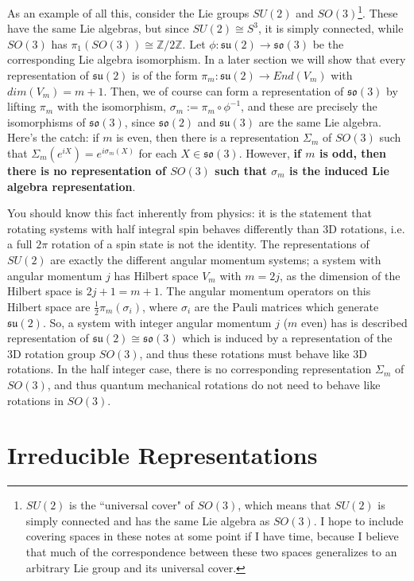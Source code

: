 \documentclass[11pt, oneside]{article}   	%
\theoremstyle{definition}
\begin{document}
As an example of all this, consider the Lie groups $SU(2)$ and $SO(3)$\footnote{$SU(2)$ is the ``universal cover" of $SO(3)$, 
which means that $SU(2)$ is simply connected and has the same Lie algebra as $SO(3)$. I hope to include covering spaces in 
these notes at some point if I have time, because I believe that much of the correspondence between these two spaces 
generalizes to an arbitrary Lie group and its universal cover.}. These have the same Lie algebras, 
but since $SU(2)\cong S^3$, it is simply connected, while $SO(3)$ has $\pi_1(SO(3))\cong\mathbb Z / 2\mathbb Z$. 
Let $\phi : \mathfrak{su}(2)\rightarrow\mathfrak{so}(3)$ be the corresponding Lie algebra isomorphism. 
In a later section we will show that every representation of $\mathfrak{su}(2)$ is of the form $\pi_m : \mathfrak{su}(2)
\rightarrow End(V_m)$ with $dim(V_m) = m + 1$. Then, we of course can form a representation of $\mathfrak{so}(3)$ 
by lifting $\pi_m$ with the isomorphism, $\sigma_m := \pi_m\circ\phi^{-1}$, and these are precisely the isomorphisms 
of $\mathfrak{so}(3)$, since $\mathfrak{so}(2)$ and $\mathfrak{su}(3)$ are the same Lie algebra. Here's the catch: 
if $m$ is even, then there is a representation $\Sigma_m$ of $SO(3)$ such that $\Sigma_m(e^{iX}) = e^{i\sigma_m(X)}$ 
for each $X\in\mathfrak{so}(3)$. However, \textbf{if $m$ is odd, then there is no representation of $SO(3)$ such that 
$\sigma_m$ is the induced Lie algebra representation}. 

You should know this fact inherently from physics: it is the statement that rotating systems with half integral spin behaves 
differently than 3D rotations, i.e. a full $2\pi$ rotation of a spin state is not the identity. The representations of $SU(2)$ are 
exactly the different angular momentum systems; a system with angular momentum $j$ has Hilbert space $V_m$ with 
$m = 2j$, as the dimension of the Hilbert space is $2j + 1 = m + 1$. The angular momentum operators on this Hilbert space 
are $\frac{1}{2}\pi_m(\sigma_i)$, where $\sigma_i$ are the Pauli matrices which generate $\mathfrak{su}(2)$. So, a system with 
integer angular momentum $j$ ($m$ even) has is described representation of $\mathfrak{su}(2)\cong\mathfrak{so}(3)$ which is 
induced by a representation of the 3D rotation group $SO(3)$, and thus these rotations must behave like 3D rotations. In the 
half integer case, there is no corresponding representation $\Sigma_m$ of $SO(3)$, and thus quantum mechanical rotations 
do not need to behave like rotations in $SO(3)$. 

\newpage
\section{Irreducible Representations}
\end{document}
